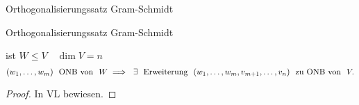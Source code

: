 \documentclass[class=article, crop=false]{standalone}
\begin{document}
\begin{zettel}{Orthogonalisierungssatz Gram-Schmidt}
\begin{flashcard}{Orthogonalisierungssatz Gram-Schmidt}
	\begin{theorem}
		ist $W \leq V \quad \dim V = n$
		\[
			(w_1,\dots, w_m)  \tx{ ONB von } W \implies \exists \tx{ Erweiterung } (w_1, \dots, w_m, v_{m+1}, \dots , v_n ) \tx{ zu ONB von } V
		.\]
	\end{theorem}
\end{flashcard}

\begin{proof}
	In VL bewiesen.
\end{proof}
\end{zettel}
\end{document}
